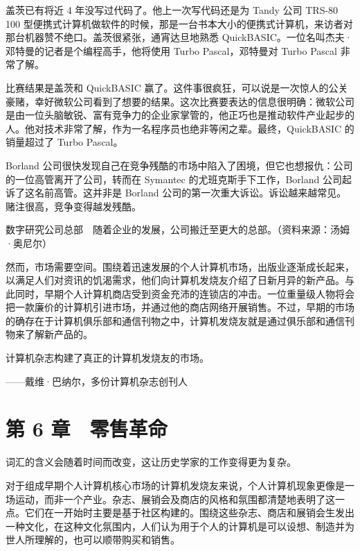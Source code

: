 \documentclass[12pt,UTF8]{ctexbook}
\begin{document}
盖茨已有将近 4 年没写过代码了。他上一次写代码还是为 Tandy 公司 TRS-80 100 型便携式计算机做软件的时候，那是一台书本大小的便携式计算机，来访者对那台机器赞不绝口。盖茨很紧张，通宵达旦地熟悉 QuickBASIC。一位名叫杰夫·邓特曼的记者是个编程高手，他将使用 Turbo Pascal，邓特曼对 Turbo Pascal 非常了解。

比赛结果是盖茨和 QuickBASIC 赢了。这件事很疯狂，可以说是一次惊人的公关豪赌，幸好微软公司看到了想要的结果。这次比赛要表达的信息很明确：微软公司是由一位头脑敏锐、富有竞争力的企业家掌管的，他正巧也是推动软件产业起步的人。他对技术非常了解，作为一名程序员也绝非等闲之辈。最终，QuickBASIC 的销量超过了 Turbo Pascal。

Borland 公司很快发现自己在竞争残酷的市场中陷入了困境，但它也想报仇：公司的一位高管离开了公司，转而在 Symantec 的尤班克斯手下工作，Borland 公司起诉了这名前高管。这并非是 Borland 公司的第一次重大诉讼。诉讼越来越常见。赌注很高，竞争变得越发残酷。



数字研究公司总部　随着企业的发展，公司搬迁至更大的总部。（资料来源：汤姆·奥尼尔）

然而，市场需要空间。围绕着迅速发展的个人计算机市场，出版业逐渐成长起来，以满足人们对资讯的饥渴需求，他们向计算机发烧友介绍了日新月异的新产品。与此同时，早期个人计算机商店受到资金充沛的连锁店的冲击。一位重量级人物将会把一款廉价的计算机引进市场，并通过他的商店网络开展销售。不过，早期的市场的确存在于计算机俱乐部和通信刊物之中，计算机发烧友就是通过俱乐部和通信刊物来了解新产品的。





计算机杂志构建了真正的计算机发烧友的市场。

——戴维·巴纳尔，多份计算机杂志创刊人





\chapter{第 6 章　零售革命}


词汇的含义会随着时间而改变，这让历史学家的工作变得更为复杂。

对于组成早期个人计算机核心市场的计算机发烧友来说，个人计算机现象更像是一场运动，而非一个产业。杂志、展销会及商店的风格和氛围都清楚地表明了这一点。它们在一开始时主要是基于社区构建的。围绕这些杂志、商店和展销会生发出一种文化，在这种文化氛围内，人们认为用于个人的计算机是可以设想、制造并为世人所理解的，也可以顺带购买和销售。
\end{document}
